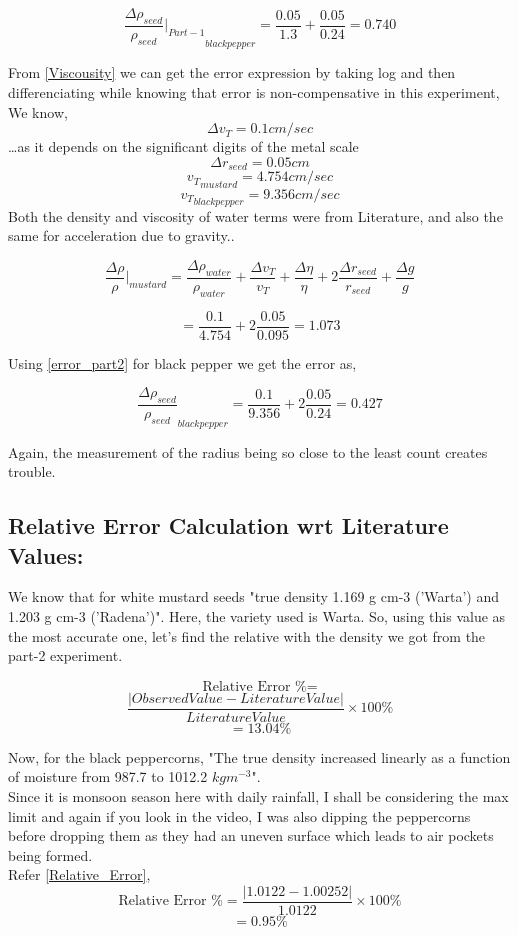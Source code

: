 \documentclass[twocolumn,11pt]{article}
\begin{document}
    $${\frac{\Delta \rho_{seed}}{\rho_{seed}}|_{Part-1}}_{black pepper} = \frac{0.05}{1.3} + \frac{0.05}{0.24}=0.740$$


    
    From \eqref{Viscousity} we can get the error expression by taking log and then differenciating while knowing that error is non-compensative in this experiment,
We know,
$$\Delta v_T = 0.1 cm/sec$$\dots as it depends on the significant digits of the metal scale\\
$$\Delta r_{seed} = 0.05cm$$
$${v_T}_{mustard} = 4.754 cm/sec$$
$${v_T}_{black pepper} = 9.356 cm/sec$$
Both the density and viscosity of water terms were from Literature\cite{density_of_water_0-100_Celsius}\cite{Vis_Lit}, and also the same for acceleration due to gravity..
    
\begin{equation}
\label{error_part2}
    \frac{\Delta\rho}{\rho}|_{mustard} =
    \frac{\Delta\rho_{water}}{\rho_{water}} + \frac{\Delta v_{T}}{v_{T}} + \frac{\Delta\eta}{\eta} + 2\frac{\Delta r_{seed}}{r_{seed}}+ \frac{\Delta g}{g}
\end{equation}

$$= \frac{0.1}{4.754} +2\frac{0.05}{0.095}=1.073$$

Using \eqref{error_part2} for black pepper we get the error as,

$${\frac{\Delta\rho_{seed}}{\rho_{seed}}}_{black pepper}=\frac{0.1}{9.356} +2\frac{0.05}{0.24}=0.427$$


Again, the measurement of the radius being so close to the least count creates trouble.


\subsection{Relative Error Calculation wrt Literature Values:}
We know that for white mustard seeds "true density 1.169 g cm-3 ('Warta') and 1.203 g cm-3 ('Radena')"\cite{mustard_data}.
Here, the variety used is Warta.
So, using this value as the most accurate one, let's find the relative with the density we got from the part-2 experiment.



$$\text{Relative Error \%} =$$
\begin{equation}
\label{Relative_Error}
\frac{|Observed Value-Literature Value|}{Literature Value} \times 100 \%
\end{equation}
$$= 13.04\%$$

Now, for the black peppercorns, "The true density increased linearly as a function of moisture from 987.7 to 1012.2 $kgm^{-3}$"\cite{pepper_data}. \\
Since it is monsoon season here with daily rainfall, I shall be considering the max limit and again if you look in the video, I was also dipping the peppercorns before dropping them as they had an uneven surface which leads to air pockets being formed. 
\\Refer \eqref{Relative_Error},
$$\text{Relative Error \%} = \frac{|1.0122-1.00252|}{1.0122} \times 100\%$$
$$=0.95\%$$
\end{document}
